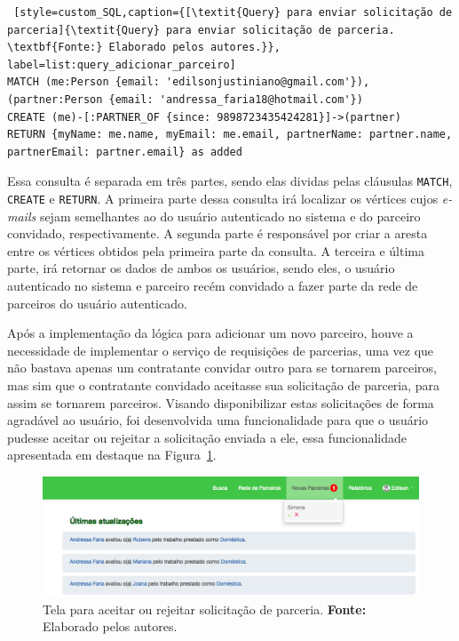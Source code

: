 \begin{lstlisting} [style=custom_SQL,caption={[\textit{Query} para enviar solicitação de parceria]{\textit{Query} para enviar solicitação de parceria. \textbf{Fonte:} Elaborado pelos autores.}}, label=list:query_adicionar_parceiro] 	
MATCH (me:Person {email: 'edilsonjustiniano@gmail.com'}),
(partner:Person {email: 'andressa_faria18@hotmail.com'})
CREATE (me)-[:PARTNER_OF {since: 9898723435424281}]->(partner)
RETURN {myName: me.name, myEmail: me.email, partnerName: partner.name, 
partnerEmail: partner.email} as added
\end{lstlisting}

\par Essa consulta é separada em três partes, sendo elas dividas pelas cláusulas \texttt{MATCH}, \texttt{CREATE} e \texttt{RETURN}. A primeira parte dessa consulta irá localizar os vértices cujos \textit{e-mails} sejam semelhantes ao do usuário autenticado no sistema e do parceiro convidado, respectivamente. A segunda parte é responsável por criar a aresta entre os vértices obtidos pela primeira parte da consulta. A terceira e última parte, irá retornar os dados de ambos os usuários, sendo eles, o usuário autenticado no sistema e parceiro recém convidado a fazer parte da rede de parceiros do usuário autenticado.

\par Após a implementação da lógica para adicionar um novo parceiro, houve a necessidade de implementar o serviço de requisições de parcerias, uma vez que não bastava apenas um contratante convidar outro para se tornarem parceiros, mas sim que o contratante convidado aceitasse sua solicitação de parceria, para assim se tornarem parceiros. Visando disponibilizar estas solicitações de forma agradável ao usuário, foi desenvolvida uma funcionalidade para que o usuário pudesse aceitar ou rejeitar a solicitação enviada a ele, essa funcionalidade apresentada em destaque na Figura~\ref{fig:aceitar_rejeitar_solicitacao_parceria}.

\begin{figure}[h!]
	\centerline{\includegraphics[scale=0.45]{./imagens/aceitar_rejeitar_solicitacao_parceria.png}}
	\caption[Tela para aceitar ou rejeitar solicitação de parceria.]
	{Tela para aceitar ou rejeitar solicitação de parceria. \textbf{Fonte:} Elaborado pelos autores.}
	\label{fig:aceitar_rejeitar_solicitacao_parceria}
\end{figure}

